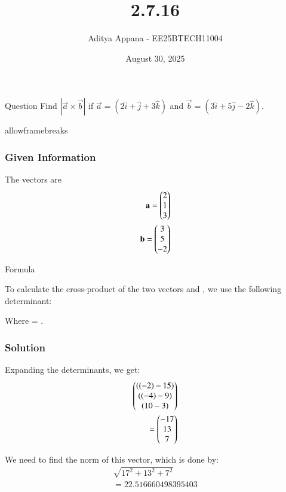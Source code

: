 \documentclass{beamer}
\title %
{2.7.16}
\date{August 30, 2025}
\author %
{Aditya Appana - EE25BTECH11004}
\begin{document}
\frame{\titlepage}
\begin{frame}{Question}
Find $|\vec{a}\times \vec{b}|$ if $\vec{a} = (2\hat{i} +\hat{j} +3\hat{k})$ and  $ \vec{b}=(3\hat{i} + 5\hat{j} - 2\hat{k})$.
\end{frame}
\begin{frame}{allowframebreaks}
\frametitle{Given Information}

    \centering
    
    \label{tab:parameters}
    The vectors are
\begin{align} 
\mathbf{a} = \begin{pmatrix}2\\1\\3\end{pmatrix}\\
\mathbf{b} = \begin{pmatrix}3\\5\\-2\end{pmatrix}
\end{align}
\end{frame}

\begin{frame}{Formula}

To calculate the cross-product of the two vectors  and , we use the following determinant:
\begin{center}
\end{center}


Where  = .

\end{frame}


\begin{frame}[fragile]
    \frametitle{Solution}

Expanding the determinants, we get: 
\begin{align}
\begin{pmatrix} ((-2) - 15) \\ ((-4) - 9) \\ (10-3)\end{pmatrix}  \\
= \begin{pmatrix}-17\\13\\7\end{pmatrix} 
\end{align}

We need to find the norm of this vector, which is done by:
\begin{align}
\sqrt{17^2+13^2+7^2} \\
=22.516660498395403
\end{align}


\end{frame}
\end{document}
